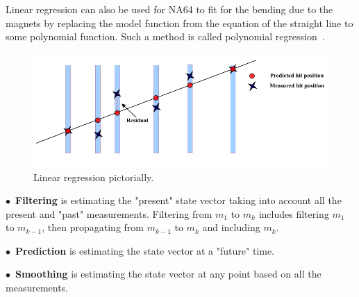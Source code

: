Linear regression can also be used for NA64 to fit for the bending due to the magnets by replacing the model function from the equation of the straight line to some polynomial function. Such a method is called polynomial regression~\cite{STIGLER1974431}.

\begin{figure}[t!]
\centering
\includegraphics[width=\textwidth]{thesis_figures/linear_reg_new.png}
\caption{Linear regression pictorially. }
\label{fig:linear_regression}
\end{figure}

\begin{description}
  \item $\bullet$~\textbf{Filtering} is estimating the "present" state vector taking into account all the present and "past" measurements. Filtering from $m_1$ to $m_k$ includes filtering $m_1$ to $m_{k-1}$, then propagating from $m_{k-1}$ to $m_k$ and including $m_k$.
  \item $\bullet$~\textbf{Prediction} is estimating the state vector at a "future" time.
  \item $\bullet$~\textbf{Smoothing} is estimating the state vector at any point based on all the measurements.
\end{description}



